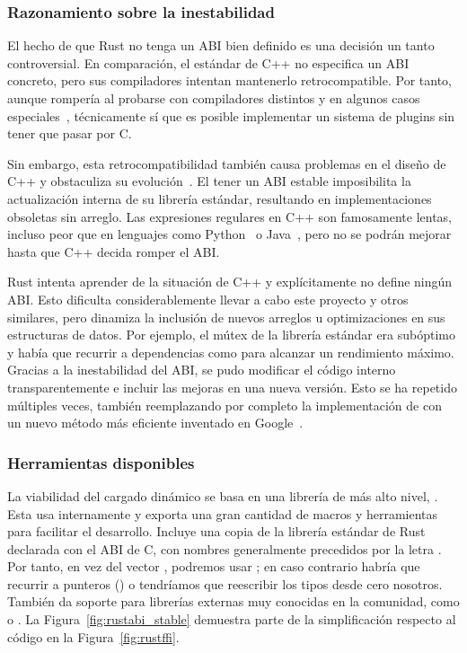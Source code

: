 \subsubsection{Razonamiento sobre la inestabilidad}

El hecho de que Rust no tenga un ABI bien definido es una decisión un tanto
controversial. En comparación, el estándar de C++ no especifica un ABI concreto,
pero sus compiladores intentan mantenerlo retrocompatible. Por tanto, aunque
rompería al probarse con compiladores distintos y en algunos casos
especiales~\cite{cpp_abi_problems}, técnicamente sí que es posible implementar
un sistema de plugins sin tener que pasar por C.

Sin embargo, esta retrocompatibilidad también causa problemas en el diseño de
C++ y obstaculiza su evolución~\cite{cpp_dead_std}. El tener un ABI estable
imposibilita la actualización interna de su librería estándar, resultando en
implementaciones obsoletas sin arreglo. Las expresiones regulares en C++ son
famosamente lentas, incluso peor que en lenguajes como
Python~\cite{cpp_vs_python_regex1}\cite{cpp_vs_python_regex2} o
Java~\cite{cpp_vs_java_regex}, pero no se podrán mejorar hasta que C++ decida
romper el ABI.

Rust intenta aprender de la situación de C++ y explícitamente no define ningún
ABI. Esto dificulta considerablemente llevar a cabo este proyecto y otros
similares, pero dinamiza la inclusión de nuevos arreglos u optimizaciones en sus
estructuras de datos. Por ejemplo, el mútex de la librería estándar era
subóptimo y había que recurrir a dependencias como  para
alcanzar un rendimiento máximo. Gracias a la inestabilidad del ABI, se pudo
modificar el código interno transparentemente e incluir las mejoras en una nueva
versión. Esto se ha repetido múltiples veces, también reemplazando por completo
la implementación de  con un nuevo método más eficiente inventado
en Google~\cite{rust_replace_map}\cite{hashbrown}.

\subsubsection{Herramientas disponibles}

La viabilidad del cargado dinámico se basa en una librería de más alto nivel,
. Esta usa  internamente y exporta una
gran cantidad de macros y herramientas para facilitar el desarrollo. Incluye una
copia de la librería estándar de Rust declarada con el ABI de C, con nombres
generalmente precedidos por la letra . Por tanto, en vez del vector
, podremos usar ; en caso contrario habría que
recurrir a punteros () o tendríamos que reescribir los tipos
desde cero nosotros. También da soporte para librerías externas muy conocidas en
la comunidad, como  o . La
Figura~\ref{fig:rustabi_stable} demuestra parte de la simplificación respecto al
código en la Figura~\ref{fig:rustffi}.

